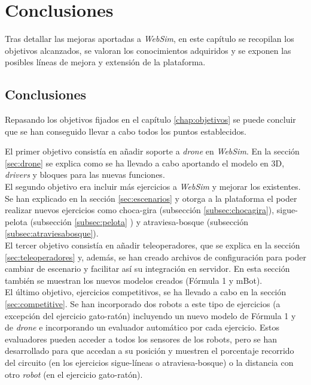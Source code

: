 \chapter{Conclusiones}
\label{chap:conclusiones}

Tras detallar las mejoras aportadas a \textit{WebSim}, en este capítulo se recopilan los objetivos alcanzados, se valoran los conocimientos adquiridos y se exponen las posibles líneas de mejora y extensión de la plataforma. 

\section{Conclusiones}
\label{sec:conclusiones}

Repasando los objetivos fijados en el capítulo \ref{chap:objetivos} se puede concluir que se han conseguido llevar a cabo todos los puntos establecidos.

El primer objetivo consistía en añadir soporte a \textit{drone} en \textit{WebSim}. En la sección \ref{sec:drone} se explica como se ha llevado a cabo aportando el modelo en 3D, \textit{drivers} y bloques para las nuevas funciones. \\

El segundo objetivo era incluir más ejercicios a \textit{WebSim} y mejorar los existentes. Se han explicado en la sección \ref{sec:escenarios} y otorga a la plataforma el poder realizar nuevos ejercicios como choca-gira (subsección \ref{subsec:chocagira}), sigue-pelota (subsección \ref{subsec:pelota} ) y atraviesa-bosque (subsección \ref{subsec:atraviesabosque}).  \\

El tercer objetivo consistía en añadir teleoperadores, que se explica en la sección \ref{sec:teleoperadores} y, además, se han creado archivos de configuración para poder cambiar de escenario y facilitar así su integración en servidor. En esta sección también se muestran los nuevos modelos creados (Fórmula 1 y mBot). \\

El último objetivo, ejercicios competitivos, se ha llevado a cabo en la sección \ref{sec:competitive}. Se han incorporado dos robots a este tipo de ejercicios (a excepción del ejercicio gato-ratón) incluyendo un nuevo modelo de Fórmula 1 y de \textit{drone} e incorporando un evaluador automático por cada ejercicio. Estos evaluadores pueden acceder a todos los sensores de los robots, pero se han desarrollado para que  accedan a su posición y muestren el porcentaje recorrido del circuito (en los ejercicios sigue-líneas o atraviesa-bosque) o la distancia con otro \textit{robot} (en el ejercicio gato-ratón). \\

